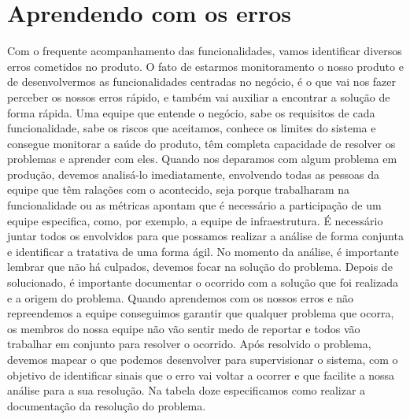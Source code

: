     \section{Aprendendo com os erros}
      Com o frequente acompanhamento das funcionalidades, vamos identificar
      diversos erros cometidos no produto. O fato de estarmos monitoramento o nosso
      produto e de desenvolvermos as funcionalidades centradas no negócio, é o que
      vai nos fazer perceber os nossos erros rápido, e também vai auxiliar
      a encontrar a solução de forma rápida. Uma equipe que entende o negócio,
      sabe os requisitos de cada funcionalidade, sabe os riscos que aceitamos,
      conhece os limites do sistema e consegue monitorar a saúde do produto, têm
      completa capacidade de resolver os problemas e aprender com eles. \newline
      Quando nos deparamos com algum problema em produção, devemos analisá-lo
      imediatamente, envolvendo todas as pessoas da equipe que têm ralações com o
      acontecido, seja porque trabalharam na funcionalidade ou as métricas apontam
      que é necessário a participação de um equipe especifica, como, por exemplo, a
      equipe de infraestrutura. É necessário juntar todos os envolvidos para que
      possamos realizar a análise de forma conjunta e identificar a tratativa de
      uma forma ágil. No momento da análise, é importante lembrar que não há
      culpados, devemos focar na solução do problema. Depois de solucionado, é
      importante documentar o ocorrido com a solução que foi realizada e a origem
      do problema. Quando aprendemos com os nossos erros e não repreendemos a
      equipe conseguimos garantir que qualquer problema que ocorra, os membros do
      nossa equipe não vão sentir medo de reportar e todos vão trabalhar em conjunto
      para resolver o ocorrido. Após resolvido o problema, devemos mapear o que
      podemos desenvolver para supervisionar o sistema, com o objetivo de identificar
      sinais que o erro vai voltar a ocorrer e que facilite a nossa análise para
      a sua resolução. Na tabela doze especificamos como realizar a documentação
      da resolução do problema. \newline

